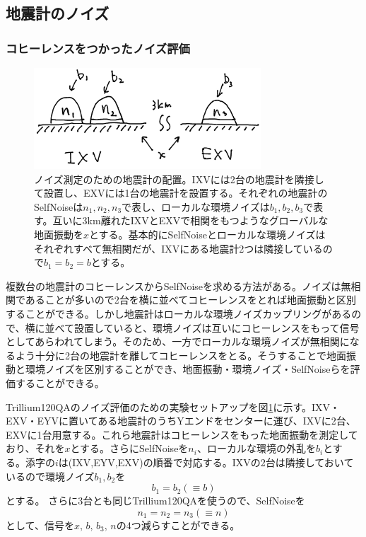 \subsection{地震計のノイズ}\label{nm}
\subsubsection{コヒーレンスをつかったノイズ評価}
\begin{figure}[H]
  \begin{center}
    \includegraphics[width=8.5cm]{./noisemeasurement.png}
  \end{center}
  \caption{ノイズ測定のための地震計の配置。IXVには2台の地震計を隣接して設置し、EXVには1台の地震計を設置する。それぞれの地震計のSelfNoiseは$n_1,n_2,n_3$で表し、ローカルな環境ノイズは$b_1,b_2,b_3$で表す。互いに3km離れたIXVとEXVで相関をもつようなグローバルな地面振動を$x$とする。基本的にSelfNoiseとローカルな環境ノイズはそれぞれすべて無相関だが、IXVにある地震計2つは隣接しているので$b_1=b_2=b$とする。
  }\label{img:img_noisemeasurement}
\end{figure}

複数台の地震計のコヒーレンスからSelfNoiseを求める方法がある\cite{peterson1980test}。ノイズは無相関であることが多いので2台を横に並べてコヒーレンスをとれば地面振動と区別することができる。しかし地震計はローカルな環境ノイズカップリングがあるので、横に並べて設置していると、環境ノイズは互いにコヒーレンスをもって信号としてあらわれてしまう。そのため、一方でローカルな環境ノイズが無相関になるよう十分に2台の地震計を離してコヒーレンスをとる。そうすることで地面振動と環境ノイズを区別することができ、地面振動・環境ノイズ・SelfNoiseらを評価することができる。

Trillium120QAのノイズ評価のための実験セットアップを図\ref{img:img_noisemeasurement}に示す。IXV・EXV・EYVに置いてある地震計のうちYエンドをセンターに運び、IXVに2台、EXVに1台用意する。これら地震計はコヒーレンスをもった地面振動を測定しており、それを$x$とする。さらにSelfNoiseを$n_i$、ローカルな環境の外乱を$b_i$とする。添字の$i$は(IXV,EYV,EXV)の順番で対応する。IXVの2台は隣接しておいているので環境ノイズ$b_1,b_2$を
\begin{equation}
  b_1=b_2\left(\equiv b\right)
\end{equation}
とする。
さらに3台とも同じTrillium120QAを使うので、SelfNoiseを
\begin{equation}
  n_1=n_2=n_3\left(\equiv n\right)
\end{equation}
として、信号を$x,\,b,\,b_3,\,n$の4つ減らすことができる。


